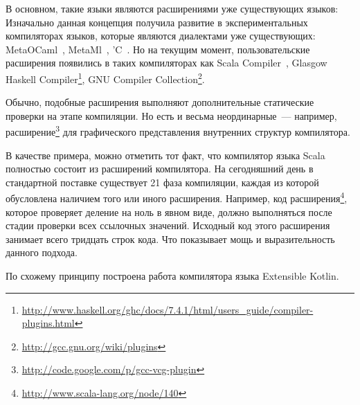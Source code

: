 В основном, такие языки являются расширениями уже существующих языков:
Изначально данная концепция получила развитие в экспериментальных компиляторах языков, которые являются диалектами уже существующих: MetaOCaml~\cite{metaocaml}, MetaMl~\cite{metaml}, 'C~\cite{extendible-c}.
Но на текущим момент, пользовательские расширения появились в таких компиляторах как
Scala Compiler~\cite{scala-spec}, Glasgow Haskell Compiler\footnote{\url{http://www.haskell.org/ghc/docs/7.4.1/html/users_guide/compiler-plugins.html}}, GNU Compiler Collection\footnote{\url{http://gcc.gnu.org/wiki/plugins}}.

Обычно, подобные расширения выполняют дополнительные статические проверки на этапе компиляции. Но есть и весьма неординарные~--- например, расширение\footnote{\url{http://code.google.com/p/gcc-vcg-plugin}} для графического представления внутренних структур компилятора.

В качестве примера, можно отметить тот факт, что компилятор языка Scala полностью состоит из расширений компилятора. На сегодняшний день в стандартной поставке существует 21 фаза компиляции, каждая из которой обусловлена наличием того или иного расширения. Например, код расширения\footnote{\url{http://www.scala-lang.org/node/140}}, которое проверяет деление на ноль в явном виде, должно выполняться после стадии проверки всех ссылочных значений. Исходный код этого расширения занимает всего тридцать строк кода. Что показывает мощь и выразительность данного подхода.

По схожему принципу построена работа компилятора языка Extensible Kotlin.

